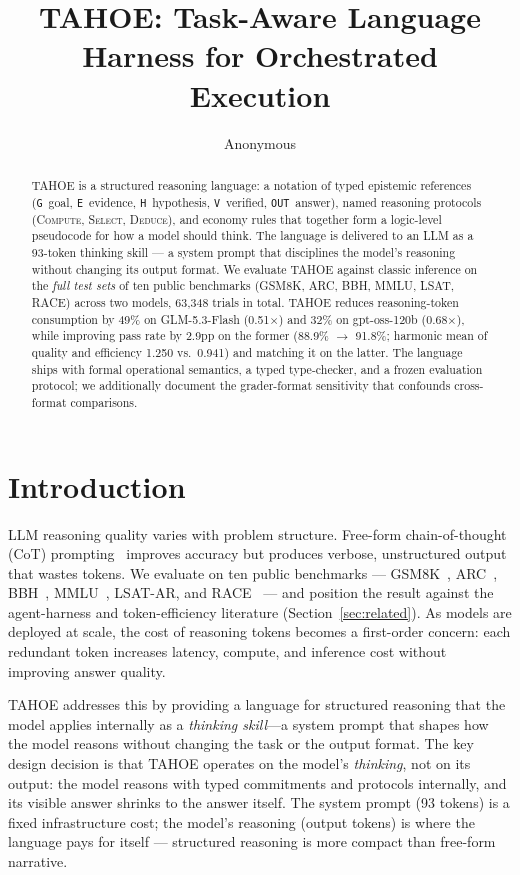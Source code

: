 \documentclass[11pt,a4paper]{article}
\title{TAHOE: Task-Aware Language Harness for Orchestrated Execution}
\author{Anonymous}
\date{}
\begin{document}
\maketitle

\begin{abstract}
TAHOE is a structured reasoning language: a notation of typed epistemic
references (\texttt{G}~goal, \texttt{E}~evidence, \texttt{H}~hypothesis,
\texttt{V}~verified, \texttt{OUT}~answer), named reasoning protocols
(\textsc{Compute}, \textsc{Select}, \textsc{Deduce}), and economy rules that
together form a logic-level pseudocode for how a model should think. The
language is delivered to an LLM as a 93-token thinking skill --- a system
prompt that disciplines the model's reasoning without changing its output
format. We evaluate TAHOE against classic inference on the \emph{full test
sets} of ten public benchmarks (GSM8K, ARC, BBH, MMLU, LSAT, RACE) across two
models, 63{,}348 trials in total. TAHOE reduces reasoning-token consumption by
49\% on GLM-5.3-Flash (0.51$\times$) and 32\% on gpt-oss-120b (0.68$\times$),
while improving pass rate by 2.9pp on the former (88.9\% $\to$ 91.8\%;
harmonic mean of quality and efficiency 1.250 vs.\ 0.941) and matching it on
the latter. The language ships with formal operational semantics, a typed
type-checker, and a frozen evaluation protocol; we additionally document the
grader-format sensitivity that confounds cross-format comparisons.
\end{abstract}

\section{Introduction}

LLM reasoning quality varies with problem structure.
Free-form chain-of-thought (CoT) prompting~\cite{wei2022cot} improves accuracy but produces verbose, unstructured output that wastes tokens. We evaluate on ten public benchmarks --- GSM8K~\cite{cobbe2021gsm8k}, ARC~\cite{clark2018arc}, BBH~\cite{suzgun2022bbh}, MMLU~\cite{hendrycks2021mmlu}, LSAT-AR, and RACE~\cite{lai2017race} --- and position the result against the agent-harness and token-efficiency literature (Section~\ref{sec:related}).
As models are deployed at scale, the cost of reasoning tokens becomes a first-order concern: each redundant token increases latency, compute, and inference cost without improving answer quality.

TAHOE addresses this by providing a language for structured reasoning that the model applies internally as a \emph{thinking skill}---a system prompt that shapes how the model reasons without changing the task or the output format.
The key design decision is that TAHOE operates on the model's \emph{thinking},
not on its output: the model reasons with typed commitments and protocols
internally, and its visible answer shrinks to the answer itself. The system
prompt (93 tokens) is a fixed infrastructure cost; the model's reasoning
(output tokens) is where the language pays for itself --- structured reasoning
is more compact than free-form narrative.
\end{document}
